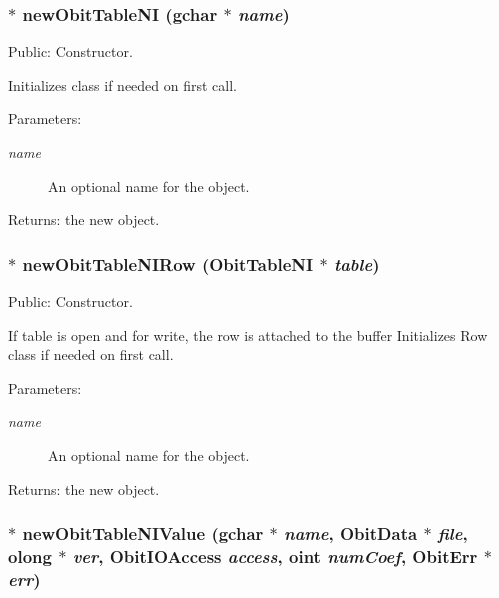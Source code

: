 \subsubsection{$\ast$ new\-Obit\-Table\-NI (gchar $\ast$ {\em name})}\label{ObitTableNI_8c_a16}


Public: Constructor. 

Initializes class if needed on first call. \begin{Desc}
\item[Parameters:]
\begin{description}
\item[{\em name}]An optional name for the object. \end{description}
\end{Desc}
\begin{Desc}
\item[Returns:]the new object. \end{Desc}
\subsubsection{$\ast$ new\-Obit\-Table\-NIRow ({\bf Obit\-Table\-NI} $\ast$ {\em table})}\label{ObitTableNI_8c_a14}


Public: Constructor. 

If table is open and for write, the row is attached to the buffer Initializes Row class if needed on first call. \begin{Desc}
\item[Parameters:]
\begin{description}
\item[{\em name}]An optional name for the object. \end{description}
\end{Desc}
\begin{Desc}
\item[Returns:]the new object. \end{Desc}
\subsubsection{$\ast$ new\-Obit\-Table\-NIValue (gchar $\ast$ {\em name}, {\bf Obit\-Data} $\ast$ {\em file}, {\bf olong} $\ast$ {\em ver}, Obit\-IOAccess {\em access}, {\bf oint} {\em num\-Coef}, {\bf Obit\-Err} $\ast$ {\em err})}\label{ObitTableNI_8c_a18}


